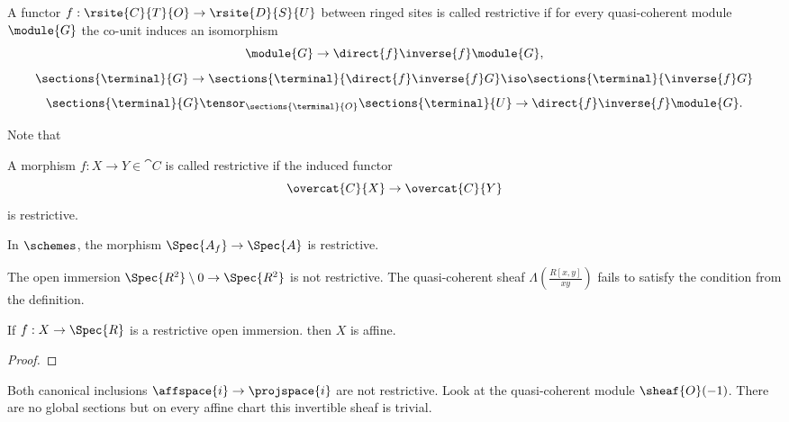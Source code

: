 \begin{definition}
A functor  $f:\rsite{C}{T}{O} \rightarrow \rsite{D}{S}{U}$ between ringed sites is called restrictive if for every quasi-coherent module $\module{G}$ the co-unit induces an isomorphism 
\[\module{G} \rightarrow \direct{f}\inverse{f}\module{G},\]
\[\sections{\terminal}{G} \rightarrow \sections{\terminal}{\direct{f}\inverse{f}G} \iso \sections{\terminal}{\inverse{f}G}\]
\[\sections{\terminal}{G}\tensor_{\sections{\terminal}{O}} \sections{\terminal}{U} \rightarrow \direct{f}\inverse{f}\module{G}.\]

Note that 
\end{definition}

\begin{definition}
A morphism $f:X\rightarrow Y\in \cat{C}$ is called restrictive if the induced functor
\[\overcat{C}{X}\rightarrow \overcat{C}{Y}\] is restrictive.
\end{definition}

\begin{example}
In $\schemes$, the morphism $\Spec{A_f} \rightarrow \Spec{A}$ is restrictive.
\end{example}

\begin{nonexample}
The open immersion $\Spec{R^2}\setminus 0 \rightarrow \Spec{R^2}$ is not restrictive.
The quasi-coherent sheaf $\Lambda(\frac{R[x,y]}{xy})$  fails to satisfy the condition from the definition.
\end{nonexample}

\begin{lemma}
If $f:X\rightarrow \Spec{R}$ is a restrictive open immersion. 
then $X$ is affine.
\end{lemma}
\begin{proof}
\end{proof}


\begin{nonexample}
Both canonical inclusions $\affspace{i} \rightarrow \projspace{i}$ are not restrictive.
Look at the quasi-coherent module $\sheaf{O}(-1)$. There are no global sections but on every affine chart this invertible sheaf is trivial.
\end{nonexample}

